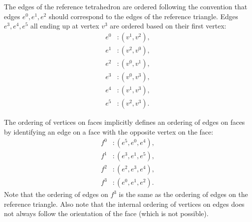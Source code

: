 The edges of the reference tetrahedron are ordered following the convention that edges $e^0, e^1, e^2$
should correspond to the edges of the reference triangle. Edges $e^3, e^4, e^5$ all ending up at vertex 
$v^3$ are ordered based on their first vertex:
\begin{equation}
  \begin{split}
    e^0 &: (v^1, v^2), \\
    e^1 &: (v^2, v^0), \\
    e^2 &: (v^0, v^1), \\
    e^3 &: (v^0, v^3), \\
    e^4 &: (v^1, v^3), \\
    e^5 &: (v^2, v^3).
  \end{split}
\end{equation}

The ordering of vertices on faces implicitly defines an ordering of edges
on faces by identifying an edge on a face with the opposite vertex on the face:
\begin{equation}
  \begin{split}
    f^0 &: (e^5, e^0, e^4), \\
    f^1 &: (e^3, e^1, e^5), \\
    f^2 &: (e^2, e^3, e^4), \\
    f^3 &: (e^0, e^1, e^2).
  \end{split}
\end{equation}
Note that the ordering of edges on $f^3$ is the same
as the ordering of edges on the reference triangle. Also note that the internal ordering
of vertices on edges does not always follow the orientation of the face (which is not possible).

